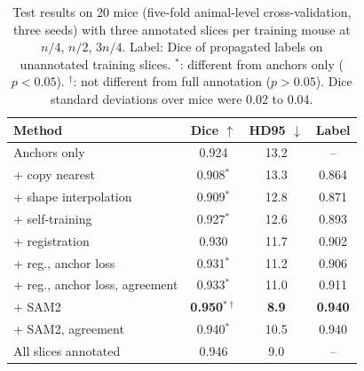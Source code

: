 \documentclass{article}
\begin{document}
\begin{table}[t]
\centering
\caption{Test results on 20 mice (five-fold animal-level cross-validation, three seeds) with three annotated slices per training mouse at $n/4$, $n/2$, $3n/4$. Label: Dice of propagated labels on unannotated training slices. $^{*}$: different from anchors only ($p<0.05$). $^{\dagger}$: not different from full annotation ($p>0.05$). Dice standard deviations over mice were 0.02 to 0.04.}
\label{tab:results}
\small
\setlength{\tabcolsep}{3pt}
\begin{tabular}{@{}lccc@{}}
\toprule
Method & Dice $\uparrow$ & HD95 $\downarrow$ & Label \\
\midrule
Anchors only & 0.924 & 13.2 & -- \\
+ copy nearest & 0.908$^{*}$ & 13.3 & 0.864 \\
+ shape interpolation & 0.909$^{*}$ & 12.8 & 0.871 \\
+ self-training & 0.927$^{*}$ & 12.6 & 0.893 \\
+ registration & 0.930 & 11.7 & 0.902 \\
+ reg., anchor loss & 0.931$^{*}$ & 11.2 & 0.906 \\
+ reg., anchor loss, agreement & 0.933$^{*}$ & 11.0 & 0.911 \\
+ SAM2 & \textbf{0.950}$^{*\dagger}$ & \textbf{8.9} & \textbf{0.940} \\
+ SAM2, agreement & 0.940$^{*}$ & 10.5 & 0.940 \\
\midrule
All slices annotated & 0.946 & 9.0 & -- \\
\bottomrule
\end{tabular}
\end{table}
\end{document}
